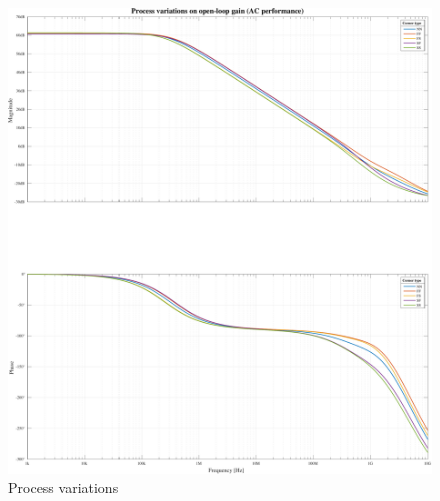 \newpage
\null
\vfill
\begin{figure}[H]
    \centering
    \includegraphics[width=1\linewidth]{Images/Simulations/corneranalysis.pdf}
    \caption{Process variations}
    \label{fig:process:variations:sim}
\end{figure}
\vfill